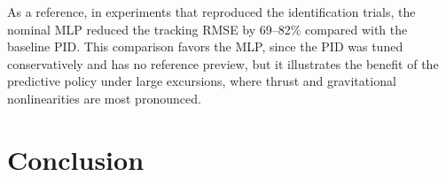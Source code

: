 \documentclass{ifacconf}
\newif\ifinstr \instrfalse
\newcommand{\instr}[1]{%
  \ifinstr
    \par\noindent
    \fcolorbox{orange!80!black}{yellow!20}{%
      \parbox{\dimexpr\linewidth-2\fboxsep-2\fboxrule}{%
        \small\sffamily\color{orange!40!black}%
        \textbf{Instrução:} #1}}%
    \par\medskip
  \fi}
\begin{document}
\begin{table}[htbp]
\begin{center}
\caption{Free-run NARX validation across unseen trials and closed-loop tracking RMSE on the physical bench (window 5--70\,s; hybrid: mean $\pm$ std over $N=10$).}\label{tab:model_comparison}
\end{center}
\end{table}

\instr{Preencher FIT e $R^2$ do multisseno de validação (o TCC só reportava o RMSE; valores calculados na validação cruzada).}

As a reference, in experiments that reproduced the identification trials, the nominal MLP reduced the tracking RMSE by 69--82\% compared with the baseline PID. This comparison favors the MLP, since the PID was tuned conservatively and has no reference preview, but it illustrates the benefit of the predictive policy under large excursions, where thrust and gravitational nonlinearities are most pronounced.

\section{Conclusion} \label{sec:conclusion}
\end{document}
